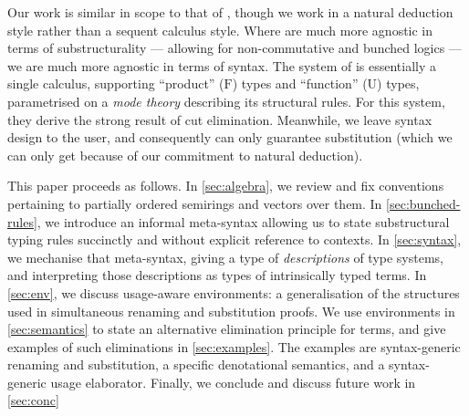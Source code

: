 Our work is similar in scope to that of \citet{LicataSR17}, though we work in
a natural deduction style rather than a sequent calculus style.
Where \citeauthor{LicataSR17} are much more agnostic in terms of
substructurality --- allowing for non-commutative and bunched logics ---
we are much more agnostic in terms of syntax.
The system of \citeauthor{LicataSR17} is essentially a single calculus,
supporting ``product'' ($\mathrm F$) types and ``function'' ($\mathrm U$)
types, parametrised on a \emph{mode theory} describing its structural rules.
For this system, they derive the strong result of cut elimination.
Meanwhile, we leave syntax design to the user, and consequently can only
guarantee substitution (which we can only get because of our commitment to
natural deduction).

This paper proceeds as follows.
In \cref{sec:algebra}, we review and fix conventions pertaining to partially
ordered semirings and vectors over them.
In \cref{sec:bunched-rules}, we introduce an informal meta-syntax allowing us
to state substructural typing rules succinctly and without explicit reference
to contexts.
In \cref{sec:syntax}, we mechanise that meta-syntax, giving a type of
\emph{descriptions} of type systems, and interpreting those descriptions as
types of intrinsically typed terms.
In \cref{sec:env}, we discuss usage-aware environments: a generalisation of
the structures used in simultaneous renaming and substitution proofs.
We use environments in \cref{sec:semantics} to state an alternative
elimination principle for terms, and give examples of such eliminations in
\cref{sec:examples}.
The examples are syntax-generic renaming and substitution, a specific
denotational semantics, and a syntax-generic usage elaborator.
Finally, we conclude and discuss future work in \cref{sec:conc}
